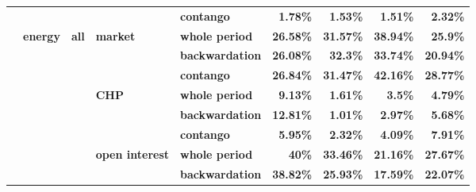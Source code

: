 \documentclass[
  authoryear,
  preprint,
  3p]{elsarticle}
\begin{document}
\begin{longtable}[t]{>{}l>{}l>{}l>{}l>{}l>{}r>{}r>{}r>{}r}
\textbf{} & \textbf{} & \textbf{} & \textbf{} & \textbf{contango} & \textcolor[HTML]{4285f4}{\textbf{1.78\%}} & \textcolor[HTML]{4285f4}{\textbf{1.53\%}} & \textcolor[HTML]{4285f4}{\textbf{1.51\%}} & \textcolor[HTML]{4285f4}{\textbf{2.32\%}}\\
\textbf{} & \textbf{energy} & \textbf{all} & \textbf{market} & \textbf{whole period} & \textcolor[HTML]{4285f4}{\textbf{26.58\%}} & \textcolor[HTML]{4285f4}{\textbf{31.57\%}} & \textcolor[HTML]{4285f4}{\textbf{38.94\%}} & \textcolor[HTML]{4285f4}{\textbf{25.9\%}}\\
\textbf{} & \textbf{} & \textbf{} & \textbf{} & \textbf{backwardation} & \textcolor[HTML]{4285f4}{\textbf{26.08\%}} & \textcolor[HTML]{4285f4}{\textbf{32.3\%}} & \textcolor[HTML]{4285f4}{\textbf{33.74\%}} & \textcolor[HTML]{4285f4}{\textbf{20.94\%}}\\
\textbf{} & \textbf{} & \textbf{} & \textbf{} & \textbf{contango} & \textcolor[HTML]{4285f4}{\textbf{26.84\%}} & \textcolor[HTML]{4285f4}{\textbf{31.47\%}} & \textcolor[HTML]{4285f4}{\textbf{42.16\%}} & \textcolor[HTML]{4285f4}{\textbf{28.77\%}}\\
\addlinespace
\textbf{} & \textbf{} & \textbf{} & \textbf{CHP} & \textbf{whole period} & \textcolor[HTML]{4285f4}{\textbf{9.13\%}} & \textcolor[HTML]{4285f4}{\textbf{1.61\%}} & \textcolor[HTML]{4285f4}{\textbf{3.5\%}} & \textcolor[HTML]{4285f4}{\textbf{4.79\%}}\\
\textbf{} & \textbf{} & \textbf{} & \textbf{} & \textbf{backwardation} & \textcolor[HTML]{4285f4}{\textbf{12.81\%}} & \textcolor[HTML]{4285f4}{\textbf{1.01\%}} & \textcolor[HTML]{4285f4}{\textbf{2.97\%}} & \textcolor[HTML]{4285f4}{\textbf{5.68\%}}\\
\textbf{} & \textbf{} & \textbf{} & \textbf{} & \textbf{contango} & \textcolor[HTML]{4285f4}{\textbf{5.95\%}} & \textcolor[HTML]{4285f4}{\textbf{2.32\%}} & \textcolor[HTML]{4285f4}{\textbf{4.09\%}} & \textcolor[HTML]{4285f4}{\textbf{7.91\%}}\\
\textbf{} & \textbf{} & \textbf{} & \textbf{open interest} & \textbf{whole period} & \textcolor[HTML]{4285f4}{\textbf{40\%}} & \textcolor[HTML]{4285f4}{\textbf{33.46\%}} & \textcolor[HTML]{4285f4}{\textbf{21.16\%}} & \textcolor[HTML]{4285f4}{\textbf{27.67\%}}\\
\textbf{} & \textbf{} & \textbf{} & \textbf{} & \textbf{backwardation} & \textcolor[HTML]{4285f4}{\textbf{38.82\%}} & \textcolor[HTML]{4285f4}{\textbf{25.93\%}} & \textcolor[HTML]{4285f4}{\textbf{17.59\%}} & \textcolor[HTML]{4285f4}{\textbf{22.07\%}}\\

\end{longtable}
\end{document}
